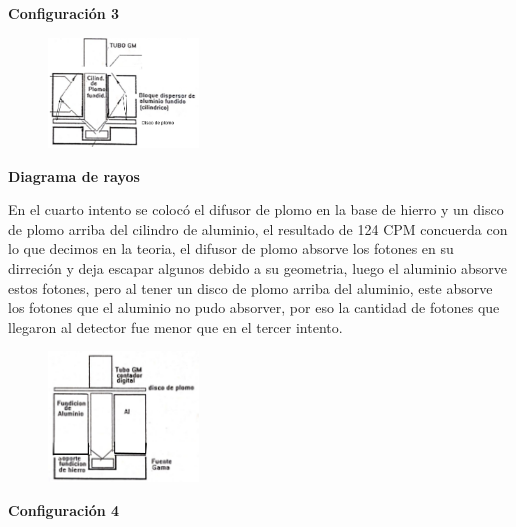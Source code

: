 \documentclass[a4paper]{article}
\begin{document}
    \begin{center}
        \textbf{Configuración 3}\\
    \end{center}

    \begin{figure}[h!]
        \centering
        \vspace{-2mm}
        \includegraphics[width=4cm]{../imagenes/imagen3b.png}
        \vspace{-5mm}
    \end{figure}

    \begin{center}
        \textbf{Diagrama de rayos}\\
    \end{center}


    \indent En el cuarto intento se colocó el difusor de plomo en la base de hierro y un disco de plomo arriba del cilindro de aluminio, el resultado de 124 CPM concuerda con lo que decimos en la teoria, el difusor de plomo absorve los fotones en su dirreción y deja escapar algunos debido a su geometria, luego el aluminio absorve estos fotones, pero al tener un disco de plomo arriba del aluminio, este absorve los fotones que el aluminio no pudo absorver, por eso la cantidad de fotones que llegaron al detector fue menor que en el tercer intento.\\

    \begin{figure}[h!]
        \centering
        \vspace{-3mm}
        \includegraphics[width=4cm]{../imagenes/imagen4.png}
        \vspace{-5mm}
    \end{figure}

    \begin{center}
        \textbf{Configuración 4}\\
    \end{center}
\end{document}
